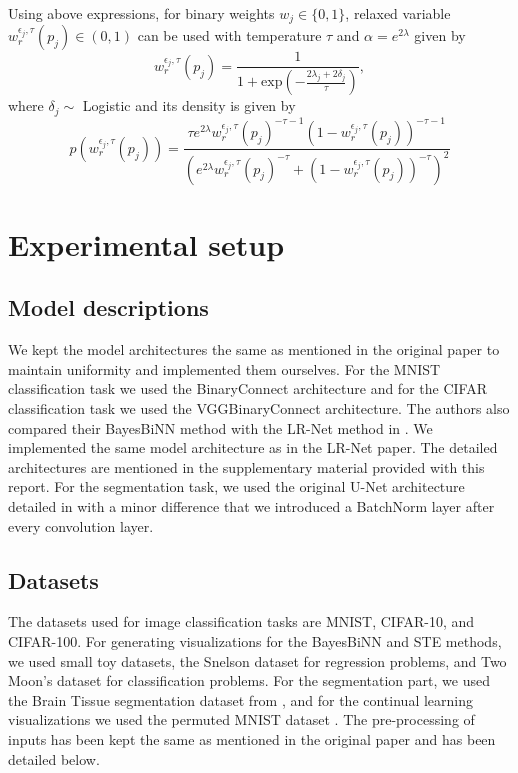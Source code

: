 Using above expressions, for binary weights $w_j \in \{0,1\}$, relaxed variable $w_{r}^{\epsilon_{j}, \tau}(p_j) \in (0,1)$ can be used with temperature $\tau$ and $\alpha = e^{2\lambda}$ given by \[ w_{r}^{\epsilon_{j}, \tau}(p_j) = \frac{1}{1 + \mathrm{exp}(-\frac{2\lambda_j + 2\delta_j}{\tau})},\] where $\delta_j \sim$ Logistic and its density is given by \[p(w_{r}^{\epsilon_{j}, \tau}(p_j)) = \frac{\tau e^{2\lambda} w_{r}^{\epsilon_{j}, \tau}(p_j)^{-\tau-1}(1-w_{r}^{\epsilon_{j}, \tau}(p_j))^{-\tau-1}}{(e^{2\lambda} w_{r}^{\epsilon_{j}, \tau}(p_j)^{-\tau} + (1-w_{r}^{\epsilon_{j}, \tau}(p_j))^{-\tau})^{2}}\]









\section{Experimental setup}


\subsection{Model descriptions}
We kept the model architectures the same as mentioned in the original paper to maintain uniformity and implemented them ourselves. For the MNIST classification task we used the BinaryConnect architecture and for the CIFAR classification task we used the VGGBinaryConnect architecture. The authors also compared their BayesBiNN method with the LR-Net method in \cite{r8}. We implemented the same model architecture as in the LR-Net paper. The detailed architectures are mentioned in the supplementary material provided with this report. For the segmentation task, we used the original U-Net architecture detailed in \cite{r11} with a minor difference that we introduced a BatchNorm layer after every convolution layer.

\subsection{Datasets}
The datasets used for image classification tasks are MNIST, CIFAR-10, and CIFAR-100. For generating visualizations for the BayesBiNN and STE methods, we used small toy datasets, the Snelson dataset \cite{r9} for regression problems, and Two Moon's dataset \cite{r10} for classification problems. For the segmentation part, we used the Brain Tissue segmentation dataset from \cite{r11}, and for the continual learning visualizations we used the permuted MNIST dataset \cite{r12}. The pre-processing of inputs has been kept the same as mentioned in the original paper and has been detailed below.

